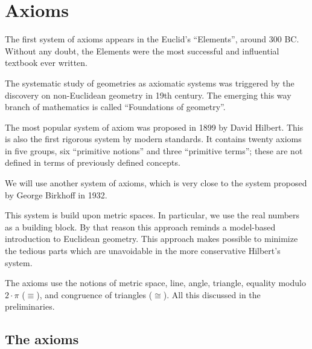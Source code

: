 \chapter{Axioms}
\label{chap:axioms}


The first system of axioms appears in the Euclid's ``Elements'', 
around 300 BC.
Without any doubt, the Elements were the most successful and influential textbook ever written.

The systematic study of geometries as axiomatic systems
 was
triggered by the discovery on non-Euclidean geometry in 19th century.
The emerging this way branch of mathematics is called ``Foundations of geometry''.

The most popular system of axiom
was proposed in 1899 by David Hilbert.
This is also the first rigorous system by modern standards.
It contains twenty axioms in five groups, six ``primitive notions'' and three ``primitive terms'';
these are not defined in terms of previously defined concepts.

We will use another system of axioms,
which is very close to the system proposed by George Birkhoff in 1932.

This system is build upon metric spaces.
In particular, we use the real numbers as a building block. 
By that reason this approach reminds a model-based introduction to Euclidean geometry.
This approach makes possible to minimize the tedious parts which are unavoidable in the more conservative Hilbert's system.

\medskip

The axioms use the notions of 
metric space, 
line, 
angle,
triangle,
equality modulo $2\cdot\pi$ ($\equiv$), 
and congruence of triangles ($\cong$).
All this discussed in the preliminaries.


\newpage

\section*{The axioms}

